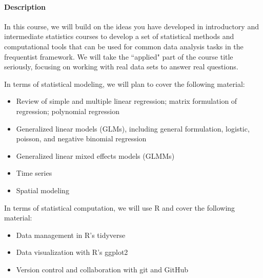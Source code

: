 \documentclass[11pt]{article}
\begin{document}
\paragraph{Description}

In this course, we will build on the ideas you have developed in introductory and intermediate statistics courses to develop a set of statistical methods and computational tools that can be used for common data analysis tasks in the frequentist framework.  We will take the ``applied" part of the course title seriously, focusing on working with real data sets to answer real questions.  

In terms of statistical modeling, we will plan to cover the following material:
\begin{itemize}
  \item Review of simple and multiple linear regression; matrix formulation of regression; polynomial regression
  \item Generalized linear models (GLMs), including general formulation, logistic, poisson, and negative binomial regression
  \item Generalized linear mixed effects models (GLMMs)
\item Time series
\item Spatial modeling
\end{itemize}

In terms of statistical computation, we will use R and cover the following material:
\begin{itemize}
  \item Data management in R's tidyverse
  \item Data visualization with R's ggplot2
  \item Version control and collaboration with git and GitHub
\end{itemize}
\end{document}
